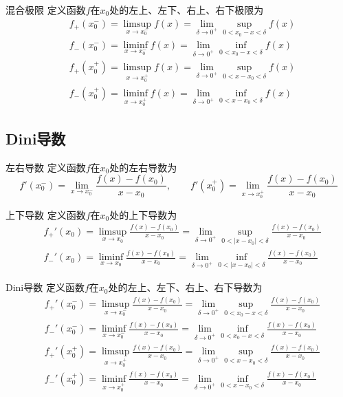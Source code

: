 \documentclass[lang = cn, scheme = chinese, thmcnt = section]{elegantbook}
\begin{document}
\begin{definition}{混合极限}
	定义函数$f$在$x_0$处的左上、左下、右上、右下极限为
	\begin{align*}
		& f_+(x_0^-)
		=\limsup_{x\to x_0^-}f(x)
		=\lim_{\delta\to 0^+}\sup_{0<x_0-x<\delta}f(x)\\
		& f_-(x_0^-)
		=\liminf_{x\to x_0^-}f(x)
		=\lim_{\delta\to 0^+}\inf_{0<x_0-x<\delta}f(x)\\
		& f_+(x_0^+)
		=\limsup_{x\to x_0^+}f(x)
		=\lim_{\delta\to 0^+}\sup_{0<x-x_0<\delta}f(x)\\
		& f_-(x_0^+)
		=\liminf_{x\to x_0^+}f(x)
		=\lim_{\delta\to 0^+}\inf_{0<x-x_0<\delta}f(x)
	\end{align*}
\end{definition}

\subsection{Dini导数}

\begin{definition}{左右导数}
	定义函数$f$在$x_0$处的左右导数为%
	$$
	f'(x_0^-)=\lim_{x\to x_0^-}\frac{f(x)-f(x_0)}{x-x_0},\qquad 
	f'(x_0^+)=\lim_{x\to x_0^+}\frac{f(x)-f(x_0)}{x-x_0}
	$$
\end{definition}

\begin{definition}{上下导数}
	定义函数$f$在$x_0$处的上下导数为%
	\begin{align*}
		& f_+'(x_0)=\limsup_{x\to x_0}\frac{f(x)-f(x_0)}{x-x_0}=\lim_{\delta\to 0^+}\sup_{0<|x-x_0|<\delta}\frac{f(x)-f(x_0)}{x-x_0}\\
		& f_-'(x_0)=\liminf_{x\to x_0}\frac{f(x)-f(x_0)}{x-x_0}=\lim_{\delta\to 0^+}\inf_{0<|x-x_0|<\delta}\frac{f(x)-f(x_0)}{x-x_0}
	\end{align*}
\end{definition}

\begin{definition}{Dini导数}
	定义函数$f$在$x_0$处的左上、左下、右上、右下导数为
	\begin{align*}
		& f_+'(x_0^-)
		=\limsup_{x\to x_0^-}\frac{f(x)-f(x_0)}{x-x_0}
		=\lim_{\delta\to 0^+}\sup_{0<x_0-x<\delta}\frac{f(x)-f(x_0)}{x-x_0}\\
		& f_-'(x_0^-)
		=\liminf_{x\to x_0^-}\frac{f(x)-f(x_0)}{x-x_0}
		=\lim_{\delta\to 0^+}\inf_{0<x_0-x<\delta}\frac{f(x)-f(x_0)}{x-x_0}\\
		& f_+'(x_0^+)
		=\limsup_{x\to x_0^+}\frac{f(x)-f(x_0)}{x-x_0}
		=\lim_{\delta\to 0^+}\sup_{0<x-x_0<\delta}\frac{f(x)-f(x_0)}{x-x_0}\\
		& f_-'(x_0^+)
		=\liminf_{x\to x_0^+}\frac{f(x)-f(x_0)}{x-x_0}
		=\lim_{\delta\to 0^+}\inf_{0<x-x_0<\delta}\frac{f(x)-f(x_0)}{x-x_0}
	\end{align*}
\end{definition}
\end{document}
